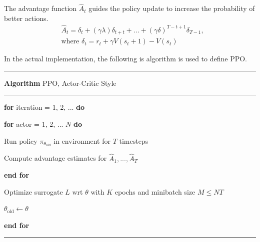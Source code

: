 \documentclass{article}
\begin{document}
The advantage function $\hat{A}_t$ guides the policy update to increase the probability of better actions.
\begin{align*}
  &\hat{A}_t = \delta_t + (\gamma\lambda)\delta_{t+t} + ... + (\gamma\delta)^{T-t+1}\delta_{T-1},\\
  &\text{where } \delta_t = r_t + \gamma V(s_t+1) - V(s_t)
\end{align*}

In the actual implementation, the following is algorithm is used to define PPO.
\vspace{4pt}

\hrule
\vspace{4pt}
\textbf{Algorithm} PPO, Actor-Critic Style
\vspace{4pt}
\hrule
\vspace{4pt}
\textbf{for} iteration = 1, 2, ... \textbf{do}

\hspace{2em} \textbf{for} actor = 1, 2, ... $N$ \textbf{do}

\hspace{4em} Run policy $\pi_{\theta_\text{old}}$ in environment for $T$ timesteps

\hspace{4em} Compute advantage estimates for $\hat{A}_1, ..., \hat{A}_T$

\hspace{2em} \textbf{end for}

\hspace{2em} Optimize surrogate $L$ wrt $\theta$ with $K$ epochs and minibatch size $M \le NT$

\hspace{2em} $\theta_\text{old} \leftarrow \theta$

\textbf{end for}
\vspace{4pt}
\hrule
\end{document}
